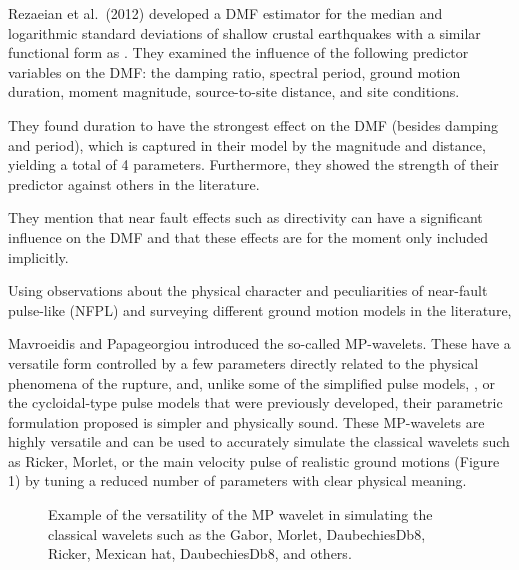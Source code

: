 Rezaeian et al.~(2012) developed a DMF estimator for the median and
logarithmic standard deviations of shallow crustal earthquakes with a
similar functional form as . They
examined the influence of the following predictor variables on the DMF:
the damping ratio, spectral period, ground motion duration, moment
magnitude, source-to-site distance, and site conditions.

They found duration to have the strongest effect on the DMF (besides
damping and period), which is captured in their model by the magnitude
and distance, yielding a total of 4 parameters. Furthermore, they showed
the strength of their predictor against others in the literature.

They mention that near fault effects such as directivity can have a
significant influence on the DMF and that these effects are for the
moment only included implicitly.

Using observations about the physical character and peculiarities of
near-fault pulse-like (NFPL) and surveying different ground motion
models in the literature,

Mavroeidis and Papageorgiou
introduced the so-called MP-wavelets. These have a versatile form
controlled by a few parameters directly related to the physical
phenomena of the rupture, and, unlike some of the simplified pulse
models,
, or the cycloidal-type pulse
models that were previously
developed, their parametric
formulation proposed is simpler and physically sound. These MP-wavelets
are highly versatile and can be used to accurately simulate the
classical wavelets such as Ricker, Morlet, or the main velocity pulse of
realistic ground motions (Figure 1) by tuning a reduced number of
parameters with clear physical meaning.

\begin{figure}
\centering
{}
\caption{Example of the versatility of the MP wavelet in simulating the
classical wavelets such as the Gabor, Morlet, DaubechiesDb8, Ricker,
Mexican hat, DaubechiesDb8, and others.}
\end{figure}

